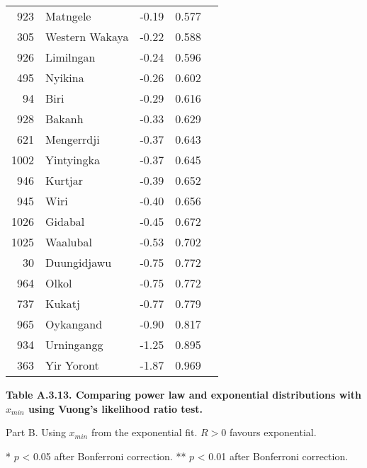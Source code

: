 \begin{longtable}[]{@{}rlrrl@{}}
923 & Matngele & -0.19 & 0.577 &\tabularnewline
305 & Western Wakaya & -0.22 & 0.588 &\tabularnewline
926 & Limilngan & -0.24 & 0.596 &\tabularnewline
495 & Nyikina & -0.26 & 0.602 &\tabularnewline
94 & Biri & -0.29 & 0.616 &\tabularnewline
928 & Bakanh & -0.33 & 0.629 &\tabularnewline
621 & Mengerrdji & -0.37 & 0.643 &\tabularnewline
1002 & Yintyingka & -0.37 & 0.645 &\tabularnewline
946 & Kurtjar & -0.39 & 0.652 &\tabularnewline
945 & Wiri & -0.40 & 0.656 &\tabularnewline
1026 & Gidabal & -0.45 & 0.672 &\tabularnewline
1025 & Waalubal & -0.53 & 0.702 &\tabularnewline
30 & Duungidjawu & -0.75 & 0.772 &\tabularnewline
964 & Olkol & -0.75 & 0.772 &\tabularnewline
737 & Kukatj & -0.77 & 0.779 &\tabularnewline
965 & Oykangand & -0.90 & 0.817 &\tabularnewline
934 & Urningangg & -1.25 & 0.895 &\tabularnewline
363 & Yir Yoront & -1.87 & 0.969 &\tabularnewline
\bottomrule
\end{longtable}

\newpage

\textbf{Table A.3.13. Comparing power law and exponential distributions
with \(x_{min}\) using Vuong's likelihood ratio test.}

Part B. Using \(x_{min}\) from the exponential fit. \(R > 0\) favours
exponential.

* \(p\) \textless{} 0.05 after Bonferroni correction. ** \(p\)
\textless{} 0.01 after Bonferroni correction.

